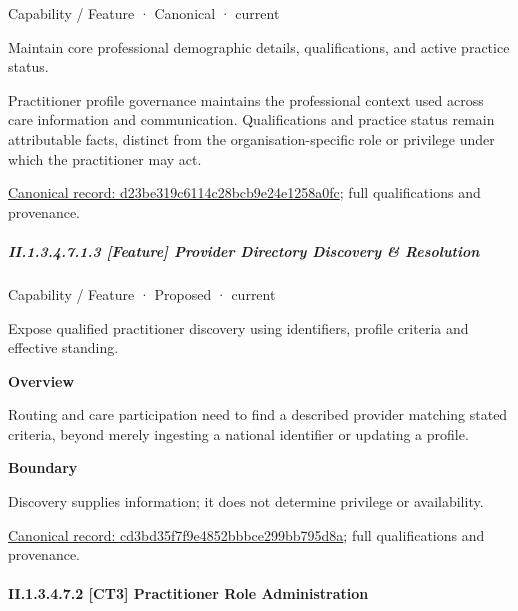 \label{element:d23be319c6114c28bcb9e24e1258a0fc}
{\small Capability / Feature · Canonical · current}\par

Maintain core professional demographic details, qualifications, and active practice status.



Practitioner profile governance maintains the professional context used across care information and communication. Qualifications and practice status remain attributable facts, distinct from the organisation-specific role or privilege under which the practitioner may act.


{\footnotesize \href{../../../../../../../continuum/strategy/capability/feature/d23be319c6114c28bcb9e24e1258a0fc.md}{Canonical record: d23be319c6114c28bcb9e24e1258a0fc}; full qualifications and provenance.}\par
\subparagraph*{II.1.3.4.7.1.3 [Feature] Provider Directory Discovery \& Resolution}
\label{navigation:II.1.3.4.7.1.3}

\label{element:cd3bd35f7f9e4852bbbce299bb795d8a}
{\small Capability / Feature · Proposed · current}\par

Expose qualified practitioner discovery using identifiers, profile criteria and effective standing.



\textbf{Overview}



Routing and care participation need to find a described provider matching stated criteria, beyond merely ingesting a national identifier or updating a profile.



\textbf{Boundary}



Discovery supplies information; it does not determine privilege or availability.


{\footnotesize \href{../../../../../../../continuum/strategy/capability/feature/cd3bd35f7f9e4852bbbce299bb795d8a.md}{Canonical record: cd3bd35f7f9e4852bbbce299bb795d8a}; full qualifications and provenance.}\par
\paragraph*{II.1.3.4.7.2 [CT3] Practitioner Role Administration}
\label{navigation:II.1.3.4.7.2}

